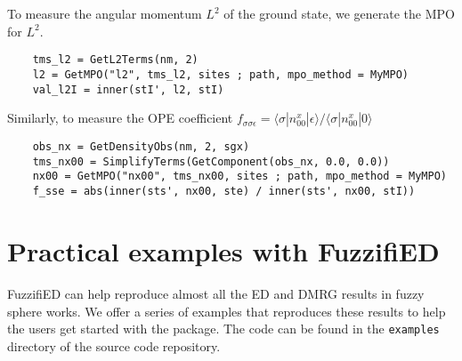 \documentclass{timesjhep}
\begin{document}
To measure the angular momentum $L^2$ of the ground state, we generate the MPO for $L^2$.
\begin{lstlisting}
    tms_l2 = GetL2Terms(nm, 2)
    l2 = GetMPO("l2", tms_l2, sites ; path, mpo_method = MyMPO)
    val_l2I = inner(stI', l2, stI)
\end{lstlisting}
Similarly, to measure the OPE coefficient $f_{\sigma\sigma\epsilon}=\langle \sigma|n^x_{00}|\epsilon\rangle/\langle \sigma|n^x_{00}|0\rangle$
\begin{lstlisting}
    obs_nx = GetDensityObs(nm, 2, sgx)
    tms_nx00 = SimplifyTerms(GetComponent(obs_nx, 0.0, 0.0))
    nx00 = GetMPO("nx00", tms_nx00, sites ; path, mpo_method = MyMPO)
    f_sse = abs(inner(sts', nx00, ste) / inner(sts', nx00, stI))
\end{lstlisting}

\section{Practical examples with FuzzifiED}
\label{sec:examples}

FuzzifiED can help reproduce almost all the ED and DMRG results in fuzzy sphere works. We offer a series of examples that reproduces these results to help the users get started with the package. The code can be found in the \lstinline|examples| directory of the source code repository. 
\end{document}
